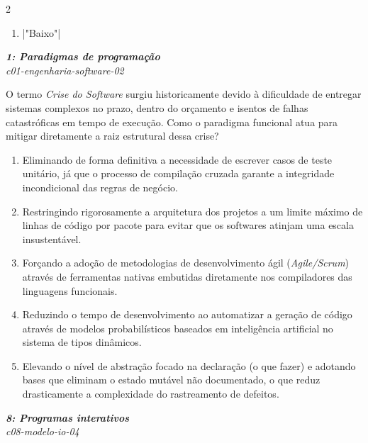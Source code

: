 \documentclass[a4paper,10pt,brazil]{article}
\begin{document}
\begin{multicols}{2}
\begin{enumerate}
  \item \haskellinline|"Baixo"|


\end{enumerate}

\begin{flushright}
  \footnotesize
  \textit{\textbf{1: Paradigmas de programação}}\\
  \textit{c01-engenharia-software-02}\\

\end{flushright}
O termo \emph{Crise do Software} surgiu historicamente devido à dificuldade de entregar sistemas complexos no prazo, dentro do orçamento e isentos de falhas catastróficas em tempo de execução. Como o paradigma funcional atua para mitigar diretamente a raiz estrutural dessa crise?

\begin{enumerate}
  \item Eliminando de forma definitiva a necessidade de escrever casos de teste unitário, já que o processo de compilação cruzada garante a integridade incondicional das regras de negócio.

  \item Restringindo rigorosamente a arquitetura dos projetos a um limite máximo de linhas de código por pacote para evitar que os softwares atinjam uma escala insustentável.

  \item Forçando a adoção de metodologias de desenvolvimento ágil (\emph{Agile/Scrum}) através de ferramentas nativas embutidas diretamente nos compiladores das linguagens funcionais.

  \item Reduzindo o tempo de desenvolvimento ao automatizar a geração de código através de modelos probabilísticos baseados em inteligência artificial no sistema de tipos dinâmicos.

  \item Elevando o nível de abstração focado na declaração (o que fazer) e adotando bases que eliminam o estado mutável não documentado, o que reduz drasticamente a complexidade do rastreamento de defeitos.


\end{enumerate}

\begin{flushright}
  \footnotesize
  \textit{\textbf{8: Programas interativos}}\\
  \textit{c08-modelo-io-04}\\


\end{flushright}
\end{multicols}
\end{document}
